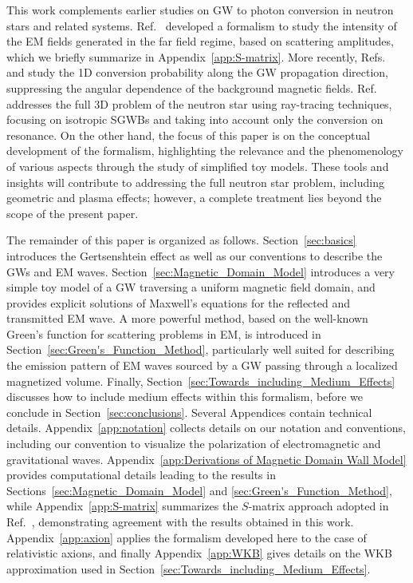 \documentclass[a4paper,11pt]{article}
\begin{document}
%
This work complements earlier studies on GW to photon conversion in neutron stars and related systems.
%
Ref.~\cite{DeLogi:1977qe} developed a formalism to study the intensity of the EM fields generated in the far field regime, based on  scattering amplitudes, which we briefly summarize in Appendix~\ref{app:S-matrix}.
%
More recently, Refs.~\cite{Ito:2023fcr} and \cite{Dandoy:2024oqg} study the 1D conversion probability along the GW propagation direction, suppressing the angular dependence of the background magnetic fields.
%
Ref.~\cite{McDonald:2024nxj} addresses the full 3D problem of the neutron star using ray-tracing techniques, focusing on isotropic SGWBs and taking into account only the conversion on resonance.
%
On the other hand, the focus of this paper is on the conceptual development of the formalism, highlighting the relevance and the phenomenology of various aspects through the study of simplified toy models.
%
These tools and insights will contribute to addressing the full neutron star problem, including geometric and plasma effects; however, a complete treatment lies beyond the scope of the present paper.
%


%
The remainder of this paper is organized as follows.
%
Section~\ref{sec:basics} introduces the Gertsenshtein effect as well as our conventions to describe the GWs and EM waves.
%
Section~\ref{sec:Magnetic_Domain_Model} introduces a very simple toy model of a GW traversing a uniform magnetic field domain, and provides explicit solutions of Maxwell's equations for the reflected and transmitted EM wave.
%
A more powerful method, based on the well-known Green's function for scattering problems in EM, is introduced in Section~\ref{sec:Green's_Function_Method}, particularly well suited for describing the emission pattern of EM waves sourced by a GW passing through a localized magnetized volume. 
%
Finally, Section~\ref{sec:Towards_including_Medium_Effects} discusses how to include medium effects within this formalism, before we conclude in Section~\ref{sec:conclusions}. Several Appendices contain technical details. 
%
Appendix~\ref{app:notation} collects details on our notation and conventions, including our convention to visualize the polarization of electromagnetic and gravitational waves.
%
Appendix~\ref{app:Derivations of Magnetic Domain Wall Model} provides computational details leading to the results in Sections~\ref{sec:Magnetic_Domain_Model} and \ref{sec:Green's_Function_Method}, while Appendix~\ref{app:S-matrix} summarizes the $S$-matrix approach adopted in Ref.~\cite{DeLogi:1977qe}, demonstrating agreement with the results obtained in this work.
%
Appendix~\ref{app:axion} applies the formalism developed here to the case of relativistic axions, and finally Appendix~\ref{app:WKB} gives details on the WKB approximation used in Section~\ref{sec:Towards_including_Medium_Effects}.
%
\end{document}
